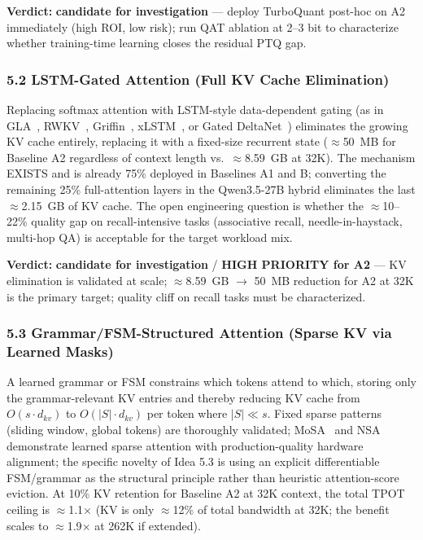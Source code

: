 \documentclass[11pt]{article}
\begin{document}
\textbf{Verdict:} \textbf{candidate for investigation} --- deploy TurboQuant post-hoc on A2 immediately (high ROI, low risk); run QAT ablation at 2--3 bit to characterize whether training-time learning closes the residual PTQ gap.

\subsubsection{5.2 LSTM-Gated Attention (Full KV Cache Elimination)}
\label{sec:idea_5_2}

Replacing softmax attention with LSTM-style data-dependent gating (as in GLA~\cite{Yang2024GLA}, RWKV~\cite{peng2023rwkv}, Griffin~\cite{De2024Griffin}, xLSTM~\cite{Beck2024xLSTM}, or Gated DeltaNet~\cite{Yang2024DeltaNet}) eliminates the growing KV cache entirely, replacing it with a fixed-size recurrent state ($\approx$50~MB for Baseline A2 regardless of context length vs.\ $\approx$8.59~GB at 32K).
The mechanism EXISTS and is already 75\% deployed in Baselines A1 and B; converting the remaining 25\% full-attention layers in the Qwen3.5-27B hybrid eliminates the last $\approx$2.15~GB of KV cache.
The open engineering question is whether the $\approx$10--22\% quality gap on recall-intensive tasks (associative recall, needle-in-haystack, multi-hop QA) is acceptable for the target workload mix.

\textbf{Verdict:} \textbf{candidate for investigation} / \textbf{HIGH PRIORITY for A2} --- KV elimination is validated at scale; $\approx$8.59~GB $\to$ 50~MB reduction for A2 at 32K is the primary target; quality cliff on recall tasks must be characterized.

\subsubsection{5.3 Grammar/FSM-Structured Attention (Sparse KV via Learned Masks)}
\label{sec:idea_5_3}

A learned grammar or FSM constrains which tokens attend to which, storing only the grammar-relevant KV entries and thereby reducing KV cache from $O(s \cdot d_{kv})$ to $O(|S| \cdot d_{kv})$ per token where $|S| \ll s$.
Fixed sparse patterns (sliding window, global tokens) are thoroughly validated; MoSA~\cite{Piekos2025MoSA} and NSA~\cite{Yuan2025NSA} demonstrate learned sparse attention with production-quality hardware alignment; the specific novelty of Idea 5.3 is using an explicit differentiable FSM/grammar as the structural principle rather than heuristic attention-score eviction.
At 10\% KV retention for Baseline A2 at 32K context, the total TPOT ceiling is $\approx$1.1$\times$ (KV is only $\approx$12\% of total bandwidth at 32K; the benefit scales to $\approx$1.9$\times$ at 262K if extended).
\end{document}
